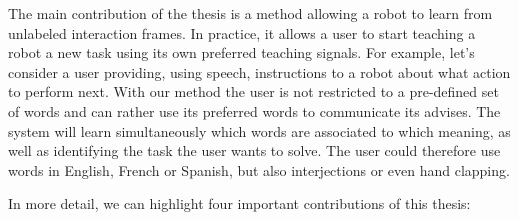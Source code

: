 The main contribution of the thesis is a method allowing a robot to learn from unlabeled interaction frames. In practice, it allows a user to start teaching a robot a new task using its own preferred teaching signals. For example, let's consider a user providing, using speech, instructions to a robot about what action to perform next. With our method the user is not restricted to a pre-defined set of words and can rather use its preferred words to communicate its advises. The system will learn simultaneously which words are associated to which meaning, as well as identifying the task the user wants to solve. The user could therefore use words in English, French or Spanish, but also interjections or even hand clapping.

In more detail, we can highlight four important contributions of this thesis:

